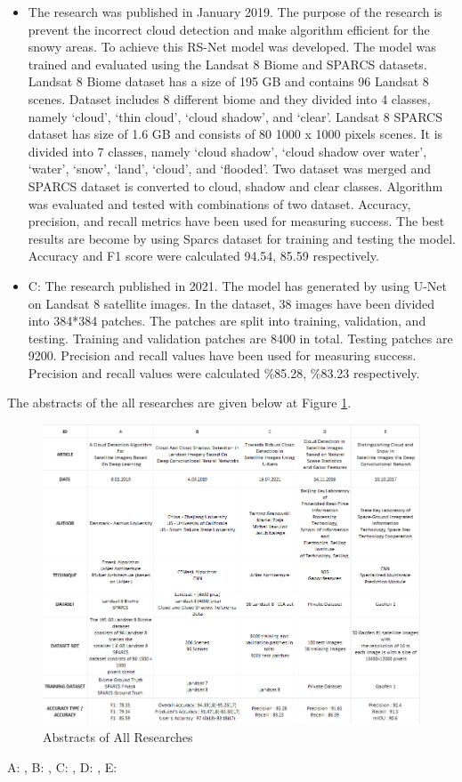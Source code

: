 \begin{itemize}
    \item \cite{first} The research was published in January 2019. The purpose of the research is prevent the incorrect cloud detection  and make algorithm efficient for the snowy areas. To achieve this RS-Net model was developed. The model was trained and evaluated using the Landsat 8 Biome and SPARCS datasets. Landsat 8 Biome dataset has a size of 195 GB and contains 96 Landsat 8 scenes. Dataset includes 8 different biome and they divided into 4 classes, namely ‘cloud’, ‘thin cloud’, ‘cloud shadow’, and ‘clear’.  Landsat 8 SPARCS dataset has size of 1.6 GB and consists of 80 1000 x 1000 pixels scenes. It is divided into 7 classes, namely ‘cloud shadow’, ‘cloud shadow over water’, ‘water’, ‘snow’, ‘land’, ‘cloud’, and ‘flooded’. Two dataset was merged and SPARCS dataset is converted to cloud, shadow and clear classes. Algorithm was evaluated and tested with combinations of two dataset. Accuracy, precision, and recall metrics have been used for measuring success. The best results are become by using Sparcs dataset for training and testing the model. Accuracy and F1 score were calculated 94.54, 85.59 respectively.

    \item  C: \cite{third} The research published in 2021. The model has generated by using U-Net on Landsat 8 satellite images. In the dataset, 38 images have been divided into 384*384 patches. The patches are split into training, validation, and testing. Training and validation patches are 8400 in total. Testing patches are 9200. Precision  and recall  values have been used for measuring success. Precision and recall values were calculated \%85.28, \%83.23 respectively.
\end{itemize}
\hfill \break
The abstracts of the all researches are given below at Figure \ref{lit_rew}.
\begin{figure}[htp]
    \centering
    \includegraphics[width=15cm]{projectChapters/images/litareture.png}
    \caption{Abstracts of All Researches}
    \label{lit_rew}
\end{figure}

A: \cite{first}, B: \cite{second}, C: \cite{third}, D: \cite{fourth}, E: \cite{fifth}
